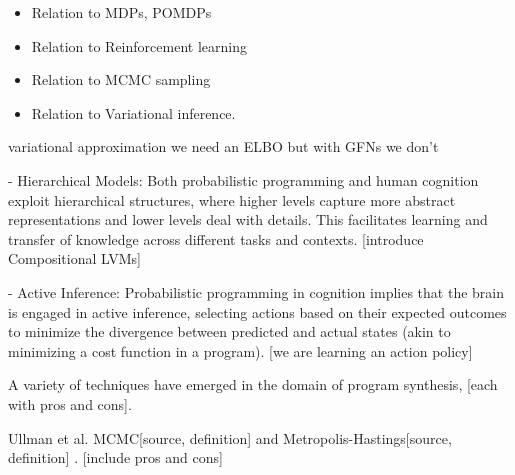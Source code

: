 \begin{itemize}
    \item Relation to MDPs, POMDPs
    \item Relation to Reinforcement learning
    \item Relation to MCMC sampling
    \item Relation to Variational inference. 
\end{itemize}


variational approximation we need an ELBO but with GFNs we don't 









- Hierarchical Models: Both probabilistic programming and human cognition exploit hierarchical structures, where higher levels capture more abstract representations and lower levels deal with details. This facilitates learning and transfer of knowledge across different tasks and contexts. [introduce Compositional LVMs]

- Active Inference: Probabilistic programming in cognition implies that the brain is engaged in active inference, selecting actions based on their expected outcomes to minimize the divergence between predicted and actual states (akin to minimizing a cost function in a program). [we are learning an action policy]












A variety of techniques have emerged in the domain of program synthesis, [each with pros and cons].

Ullman et al. MCMC[source, definition] and Metropolis-Hastings[source, definition] \cite{ullman_theory_2012}. [include pros and cons]




